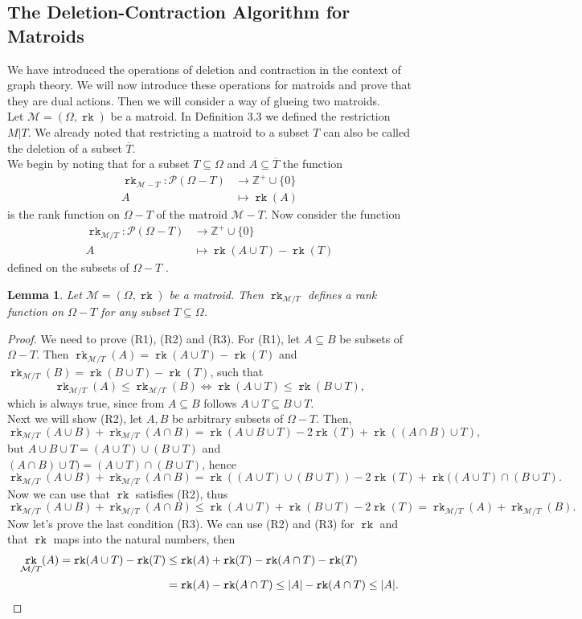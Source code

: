 \documentclass[12pt,a4paper, twoside, autooneside=false]{scrartcl}
\newtheorem{lemma}[theorem]{Lemma}
\theoremstyle{definition}
\theoremstyle{remark}
\numberwithin{equation}{section}
\DeclareMathOperator{\rk}{\mathtt{rk}}
\newcommand{\M}{\mathcal{M}} %
\begin{document}
\subsection{The Deletion-Contraction Algorithm for Matroids}
We have introduced the operations of deletion and contraction in the context of graph theory. We will now introduce these operations for matroids and prove that they are dual actions. Then we will consider a way of glueing two matroids. \\
\indent Let $\M = (\Omega, \rk)$ be a matroid. In Definition 3.3 we defined the restriction $M|T$. We already noted that restricting a matroid to a subset $T$ can also be called the deletion of a subset $\overline{T}$. \\ \indent We begin by noting that for a subset $T \subseteq \Omega$ and $A \subseteq \overline{T}$ the function 
\begin{align*}
\rk_{\M - T} : \mathcal{P}(\Omega - T) &\to \mathbb{Z}^+ \cup \{0\} \\ 
A &\mapsto \rk(A)
\end{align*}
is the rank function on $\Omega - T$ of the matroid $ \M - T$. Now consider the function 
\begin{align*}
\rk_{\M / T}: \mathcal{P}(\Omega - T) &\to \mathbb{Z}^+ \cup \{0\} \\ 
A &\mapsto \rk(A \cup T) - \rk(T)
\end{align*}
defined on the subsets of $\Omega - T$ .
\begin{lemma} 
Let $\M = (\Omega, \rk)$ be a matroid. Then $\rk_{\M / T}$ defines a rank function on $\Omega - T$ for any subset $T \subseteq \Omega$. 
\end{lemma}
\begin{proof}
We need to prove (R1), (R2) and (R3). For (R1), let $A \subseteq B$ be subsets of $\Omega - T$. Then $\rk_{\M / T} (A) = \rk(A \cup T) - \rk(T)$ and $\rk_{\M / T} (B) = \rk(B \cup T) - \rk(T)$, such that 
\[ \rk_{\M / T} (A) \leq  \rk_{\M / T} (B) 
\Longleftrightarrow  \rk(A \cup T) \leq \rk(B \cup T),
\]
which is always true, since from $A \subseteq B$ follows $A \cup T \subseteq B \cup T$. \\ \indent Next we will show (R2), let $A,B$ be arbitrary subsets of $\Omega - T$. Then, 
\[
\rk_{\M / T} (A \cup B) + \rk_{\M / T}( A \cap B) = \rk(A \cup B \cup T) - 2 \rk(T) + \rk((A \cap B) \cup T),
\]
but $A \cup B \cup T = (A \cup T) \cup (B \cup T)$ and $(A \cap B) \cup T) = (A \cup T) \cap (B \cup T)$, hence 
\[
\rk_{\M / T} (A \cup B) + \rk_{\M / T}(A \cap B) = \rk((A \cup T) \cup (B \cup T)) - 2 \rk(T) + \rk((A \cup T) \cap (B \cup T).
\]
Now we can use that $\rk$ satisfies (R2), thus 
\[
\rk_{\M / T} (A \cup B) + \rk_{\M / T}(A \cap B) \leq \rk(A \cup T) + \rk(B \cup T) - 2 \rk(T) = \rk_{\M / T}(A) + \rk_{\M / T}(B).
\]
\indent Now let's prove the last condition (R3).
We can use (R2) and (R3) for $\rk$ and that $\rk$ maps into the natural numbers, then
\begin{align*}
\rk_{\M /  T} (A) = \rk(A \cup T) - \rk(T) &\leq \rk(A) + \rk(T) - \rk(A \cap T) - \rk(T) \\ 
&= \rk(A) - \rk(A \cap T) \leq |A| - \rk(A \cap T) \leq |A|.\qedhere
\end{align*}
\end{proof}
\end{document}
